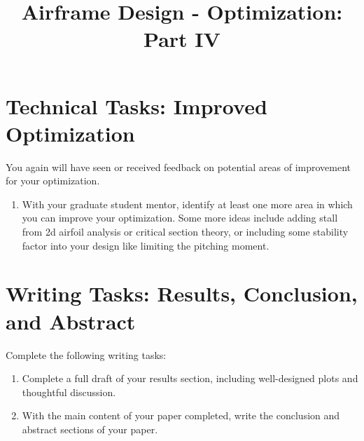 \documentclass[12pt]{article}
\title{Airframe Design - Optimization: Part IV}
\date{}
\begin{document}
	
\maketitle
\vspace{-2cm}
	
	

\section{Technical Tasks: Improved Optimization}

You again will have seen or received feedback on potential areas of improvement for your optimization.

\begin{enumerate}[label=\alph*.]
	\item With your graduate student mentor, identify at least one more area in which you can improve your optimization. Some more ideas include adding stall from 2d airfoil analysis or critical section theory, or including some stability factor into your design like limiting the pitching moment.
\end{enumerate}



	

\section{Writing Tasks: Results, Conclusion, and Abstract}

Complete the following writing tasks:

\begin{enumerate}[label=\alph*.]
	\item Complete a full draft of your results section, including well-designed plots and thoughtful discussion.  
	\item With the main content of your paper completed, write the conclusion and abstract sections of your paper.
\end{enumerate}


	
	
	
\end{document}
